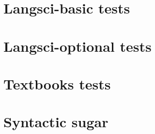 \documentclass[output=book
	      ,nonflat      ,modfonts,
	      ,colorlinks
	      ,showindex
	      ]{langsci/langscibook}
\begin{document}
\section{Langsci-basic tests}
\section{Langsci-optional tests}
\section{Textbooks tests}
 
 
 
\section{Syntactic sugar}
 

\end{document}
